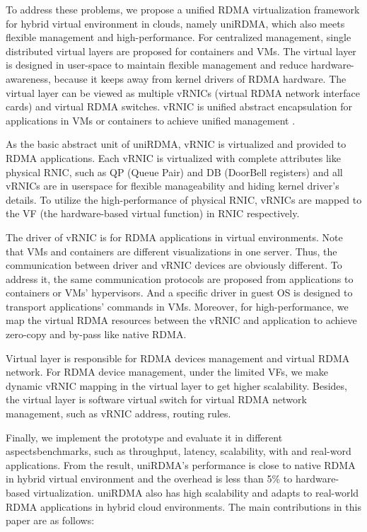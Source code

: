 To address these problems, we propose a unified RDMA virtualization framework for hybrid virtual environment in clouds, namely uniRDMA, which also meets flexible management and high-performance. For centralized management, single distributed virtual layers are proposed for containers and VMs. The virtual layer is designed in user-space to maintain flexible management and reduce hardware-awareness, because it keeps away from kernel drivers of RDMA hardware. The virtual layer can be viewed as  multiple vRNICs (virtual RDMA network interface cards) and virtual RDMA switches. vRNIC is unified abstract encapsulation for applications in VMs or containers to achieve unified management . 

As the basic abstract unit of uniRDMA, vRNIC is virtualized and provided to RDMA applications. Each vRNIC is virtualized with complete attributes like physical RNIC, such as QP (Queue Pair) and DB (DoorBell registers) and all vRNICs are in userspace for flexible manageability and hiding kernel driver’s details. To utilize the high-performance of physical RNIC, vRNICs are mapped to the VF (the hardware-based virtual function) in RNIC respectively.

The driver of vRNIC is for RDMA applications in virtual environments. Note that VMs and containers are different visualizations in one server. Thus, the communication between driver and vRNIC devices are obviously different. To address it, the same communication protocols are proposed from applications to containers or VMs’ hypervisors. And a specific driver in guest OS is designed to transport applications’ commands in VMs. Moreover, for high-performance, we map the virtual RDMA resources between the vRNIC and application to achieve zero-copy and by-pass like native RDMA.

Virtual layer is responsible for RDMA devices management and virtual RDMA network. For RDMA device management,  under the limited VFs, we make dynamic vRNIC mapping in the virtual layer to get higher scalability. Besides, the virtual layer is software virtual switch for virtual RDMA network management, such as vRNIC address, routing rules.

Finally, we implement the prototype and evaluate it in different aspectsbenchmarks, such as throughput, latency, scalability, with and real-word applications. From the result, uniRDMA’s performance is close to native RDMA in hybrid virtual environment and the overhead is less than 5\% to hardware-based virtualization. uniRDMA also has high scalability and adapts to real-world RDMA applications in hybrid cloud environments. The main contributions in this paper are as follows:


